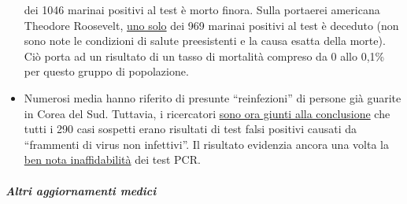 \begin{itemize}
  dei 1046 marinai positivi al test è morto finora. Sulla portaerei
  americana Theodore Roosevelt,
  \href{https://en.wikipedia.org/wiki/COVID-19_pandemic_on_USS_Theodore_Roosevelt}{uno
  solo} dei 969 marinai positivi al test è deceduto (non sono note le
  condizioni di salute preesistenti e la causa esatta della morte). Ciò
  porta ad un risultato di un tasso di mortalità compreso da 0 allo
  0,1\% per questo gruppo di popolazione.
\item
  Numerosi media hanno riferito di presunte ``reinfezioni'' di persone
  già guarite in Corea del Sud. Tuttavia, i ricercatori
  \href{https://www.independent.co.uk/news/world/asia/coronavirus-south-korea-patients-infected-twice-test-a9491986.html}{sono
  ora giunti alla conclusione} che tutti i 290 casi sospetti erano
  risultati di test falsi positivi causati da ``frammenti di virus non
  infettivi''. Il risultato evidenzia ancora una volta la
  \href{https://www.ncbi.nlm.nih.gov/pubmed/32219885}{ben nota
  inaffidabilità} dei test PCR.
\end{itemize}

\hypertarget{altri-aggiornamenti-medici}{%
\subparagraph{\texorpdfstring{\textbf{Altri aggiornamenti
medici}}{Altri aggiornamenti medici}}\label{altri-aggiornamenti-medici}}

